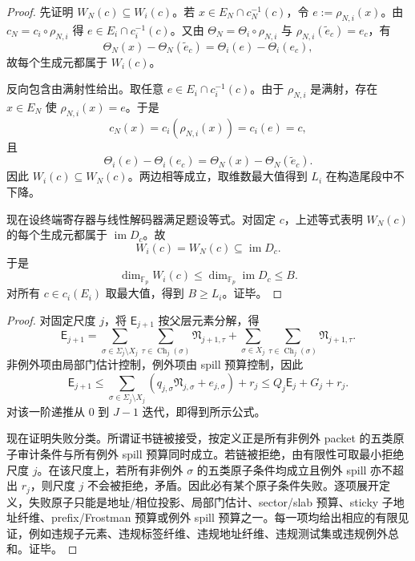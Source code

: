 \begin{proof}
先证明 \(W_N(c)\subseteq W_i(c)\)。若 \(x\in E_N\cap c_N^{-1}(c)\)，令 \(e:=\rho_{N,i}(x)\)。由 \(c_N=c_i\circ\rho_{N,i}\) 得 \(e\in E_i\cap c_i^{-1}(c)\)。又由 \(\Theta_N=\Theta_i\circ\rho_{N,i}\) 与 \(\rho_{N,i}(\widetilde e_c)=e_c\)，有
\[
\Theta_N(x)-\Theta_N(\widetilde e_c)
=\Theta_i(e)-\Theta_i(e_c),
\]
故每个生成元都属于 \(W_i(c)\)。

反向包含由满射性给出。取任意 \(e\in E_i\cap c_i^{-1}(c)\)。由于 \(\rho_{N,i}\) 是满射，存在 \(x\in E_N\) 使 \(\rho_{N,i}(x)=e\)。于是
\[
c_N(x)=c_i(\rho_{N,i}(x))=c_i(e)=c,
\]
且
\[
\Theta_i(e)-\Theta_i(e_c)
=\Theta_N(x)-\Theta_N(\widetilde e_c).
\]
因此 \(W_i(c)\subseteq W_N(c)\)。两边相等成立，取维数最大值得到 \(L_i\) 在构造尾段中不下降。

现在设终端寄存器与线性解码器满足题设等式。对固定 \(c\)，上述等式表明 \(W_N(c)\) 的每个生成元都属于 \(\operatorname{im}D_c\)。故
\[
W_i(c)=W_N(c)\subseteq \operatorname{im}D_c.
\]
于是
\[
\dim_{\mathbb F_p}W_i(c)\le \dim_{\mathbb F_p}\operatorname{im}D_c\le B.
\]
对所有 \(c\in c_i(E_i)\) 取最大值，得到 \(B\ge L_i\)。证毕。
\end{proof}


\begin{proof}
对固定尺度 \(j\)，将 \(\mathsf E_{j+1}\) 按父层元素分解，得
\[
\mathsf E_{j+1}
=\sum_{\sigma\in\Sigma_j\setminus X_j}
\sum_{\tau\in\operatorname{Ch}_j(\sigma)}\mathfrak N_{j+1,\tau}
+\sum_{\sigma\in X_j}
\sum_{\tau\in\operatorname{Ch}_j(\sigma)}\mathfrak N_{j+1,\tau}.
\]
非例外项由局部门估计控制，例外项由 spill 预算控制，因此
\[
\mathsf E_{j+1}
\le
\sum_{\sigma\in\Sigma_j\setminus X_j}
(q_{j,\sigma}\mathfrak N_{j,\sigma}+e_{j,\sigma})+r_j
\le Q_j\mathsf E_j+G_j+r_j.
\]
对该一阶递推从 \(0\) 到 \(J-1\) 迭代，即得到所示公式。

现在证明失败分类。所谓证书链被接受，按定义正是所有非例外 packet 的五类原子审计条件与所有例外 spill 预算同时成立。若链被拒绝，由有限性可取最小拒绝尺度 \(j\)。在该尺度上，若所有非例外 \(\sigma\) 的五类原子条件均成立且例外 spill 亦不超出 \(r_j\)，则尺度 \(j\) 不会被拒绝，矛盾。因此必有某个原子条件失败。逐项展开定义，失败原子只能是地址/相位投影、局部门估计、sector/slab 预算、sticky 子地址纤维、prefix/Frostman 预算或例外 spill 预算之一。每一项均给出相应的有限见证，例如违规子元素、违规标签纤维、违规地址纤维、违规测试集或违规例外总和。证毕。
\end{proof}

